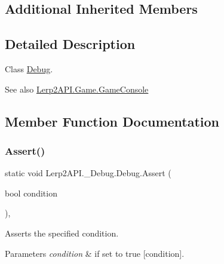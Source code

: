 \subsection*{Additional Inherited Members}


\subsection{Detailed Description}
Class \hyperlink{class_lerp2_a_p_i_1_1___debug_1_1_debug}{Debug}. 

\begin{DoxySeeAlso}{See also}
\hyperlink{class_lerp2_a_p_i_1_1_game_1_1_game_console}{Lerp2\+A\+P\+I.\+Game.\+Game\+Console}


\end{DoxySeeAlso}


\subsection{Member Function Documentation}
\mbox{\label{class_lerp2_a_p_i_1_1___debug_1_1_debug_abb6e811db2846e5569c741793173039b}} 
\subsubsection{\texorpdfstring{Assert()}{Assert()}\hspace{0.1cm}{\footnotesize\ttfamily [1/5]}}
{\footnotesize\ttfamily static void Lerp2\+A\+P\+I.\+\_\+\+Debug.\+Debug.\+Assert (\begin{DoxyParamCaption}\item[{bool}]{condition }\end{DoxyParamCaption})\hspace{0.3cm}{\ttfamily [inline]}, {\ttfamily [static]}}



Asserts the specified condition. 


\begin{DoxyParams}{Parameters}
{\em condition} & if set to {\ttfamily true} \mbox{[}condition\mbox{]}.\\
\hline
\end{DoxyParams}
\mbox{\label{class_lerp2_a_p_i_1_1___debug_1_1_debug_a55863e880370c7d30971775495b3797c}} 
